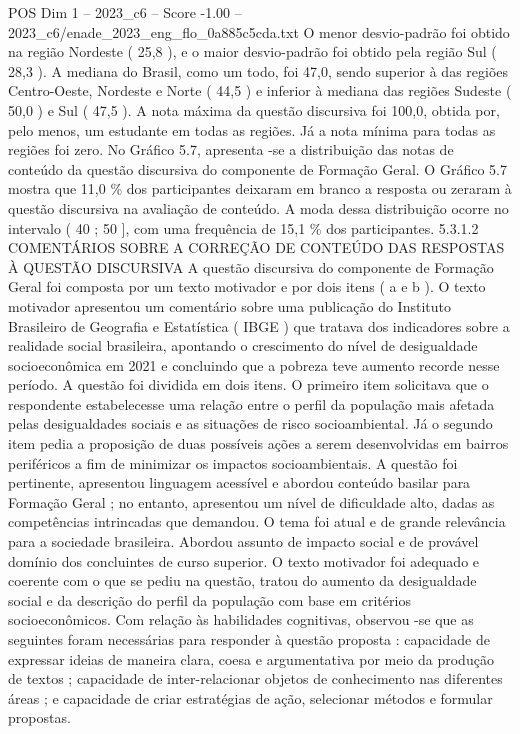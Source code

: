 \begin{textsample}{POS Dim 1 – 2023\_c6 – Score -1.00 – 2023\_c6/enade\_2023\_eng\_flo\_0a885c5cda.txt}
O menor desvio-padrão foi obtido na região Nordeste ( 25,8 ), e o maior desvio-padrão foi obtido pela região Sul ( 28,3 ).
A mediana do Brasil, como um todo, foi 47,0, sendo superior à das regiões Centro-Oeste, Nordeste e Norte ( 44,5 ) e inferior à mediana das regiões Sudeste ( 50,0 ) e Sul ( 47,5 ).
A nota máxima da questão discursiva foi 100,0, obtida por, pelo menos, um estudante em todas as regiões.
Já a nota mínima para todas as regiões foi zero.
No Gráfico 5.7, apresenta -se a distribuição das notas de conteúdo da questão discursiva do componente de Formação Geral.
O Gráfico 5.7 mostra que 11,0 \% dos participantes deixaram em branco a resposta ou zeraram à questão discursiva na avaliação de conteúdo.
A moda dessa distribuição ocorre no intervalo ( 40 ; 50 ], com uma frequência de 15,1 \% dos participantes. 5.3.1.2 COMENTÁRIOS SOBRE A CORREÇÃO DE CONTEÚDO DAS RESPOSTAS À QUESTÃO DISCURSIVA A questão discursiva do componente de Formação Geral foi composta por um texto motivador e por dois itens ( a e b ).
O texto motivador apresentou um comentário sobre uma publicação do Instituto Brasileiro de Geografia e Estatística ( IBGE ) que tratava dos indicadores sobre a realidade social brasileira, apontando o crescimento do nível de desigualdade socioeconômica em 2021 e concluindo que a pobreza teve aumento recorde nesse período.
A questão foi dividida em dois itens.
O primeiro item solicitava que o respondente estabelecesse uma relação entre o perfil da população mais afetada pelas desigualdades sociais e as situações de risco socioambiental.
Já o segundo item pedia a proposição de duas possíveis ações a serem desenvolvidas em bairros periféricos a fim de minimizar os impactos socioambientais.
A questão foi pertinente, apresentou linguagem acessível e abordou conteúdo basilar para Formação Geral ; no entanto, apresentou um nível de dificuldade alto, dadas as competências intrincadas que demandou.
O tema foi atual e de grande relevância para a sociedade brasileira.
Abordou assunto de impacto social e de provável domínio dos concluintes de curso superior.
O texto motivador foi adequado e coerente com o que se pediu na questão, tratou do aumento da desigualdade social e da descrição do perfil da população com base em critérios socioeconômicos.
Com relação às habilidades cognitivas, observou -se que as seguintes foram necessárias para responder à questão proposta : capacidade de expressar ideias de maneira clara, coesa e argumentativa por meio da produção de textos ; capacidade de inter-relacionar objetos de conhecimento nas diferentes áreas ; e capacidade de criar estratégias de ação, selecionar métodos e formular propostas.

\end{textsample}
